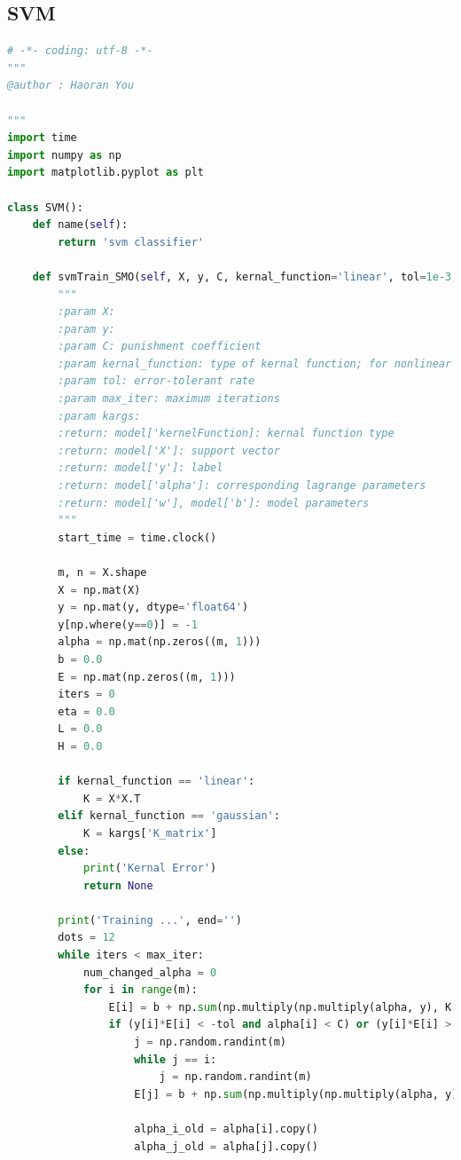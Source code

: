 \documentclass[UTF-8, a4paper, 10pt]{article}
\numberwithin{equation}{section}
\begin{document}
\subsection{SVM}
\begin{lstlisting}[language=python]
# -*- coding: utf-8 -*-
"""
@author : Haoran You

"""
import time
import numpy as np
import matplotlib.pyplot as plt

class SVM():
    def name(self):
        return 'svm classifier'

    def svmTrain_SMO(self, X, y, C, kernal_function='linear', tol=1e-3, max_iter=5, **kargs):
        """
        :param X:
        :param y:
        :param C: punishment coefficient
        :param kernal_function: type of kernal function; for nonlinear function, input K directly
        :param tol: error-tolerant rate
        :param max_iter: maximum iterations
        :param kargs:
        :return: model['kernelFunction]: kernal function type
        :return: model['X']: support vector
        :return: model['y']: label
        :return: model['alpha']: corresponding lagrange parameters
        :return: model['w'], model['b']: model parameters
        """
        start_time = time.clock()

        m, n = X.shape
        X = np.mat(X)
        y = np.mat(y, dtype='float64')
        y[np.where(y==0)] = -1
        alpha = np.mat(np.zeros((m, 1)))
        b = 0.0
        E = np.mat(np.zeros((m, 1)))
        iters = 0
        eta = 0.0
        L = 0.0
        H = 0.0

        if kernal_function == 'linear':
            K = X*X.T
        elif kernal_function == 'gaussian':
            K = kargs['K_matrix']
        else:
            print('Kernal Error')
            return None

        print('Training ...', end='')
        dots = 12
        while iters < max_iter:
            num_changed_alpha = 0
            for i in range(m):
                E[i] = b + np.sum(np.multiply(np.multiply(alpha, y), K[:, i])) - y[i]
                if (y[i]*E[i] < -tol and alpha[i] < C) or (y[i]*E[i] > tol and alpha[i] > 0):
                    j = np.random.randint(m)
                    while j == i:
                        j = np.random.randint(m)
                    E[j] = b + np.sum(np.multiply(np.multiply(alpha, y), K[:, j])) - y[j]

                    alpha_i_old = alpha[i].copy()
                    alpha_j_old = alpha[j].copy()


\end{lstlisting}
\end{document}
